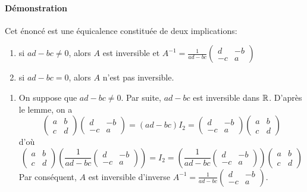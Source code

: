 \paragraph{Démonstration} Cet énoncé est une équicalence constituée de deux implications:
\begin{enumerate}
\item si $ad-bc\neq 0$, alors $A$ est inversible et $A^{-1}=\frac{1}{ad-bc}\begin{pmatrix} d & -b \\ -c & a\end{pmatrix}$
\item si $ad-bc=0$, alors $A$ n'est pas inversible.
\end{enumerate}
\begin{enumerate}
\item On suppose que $a d - b c \neq 0$. Par suite, $a d - b c$ est inversible dans $\mathbb{R}$. D'après le lemme, on a
$$\begin{pmatrix} a & b \\ c & d \end{pmatrix} \begin{pmatrix} d & -b \\ -c & a \end{pmatrix} = (a d - b c) I_2 =  \begin{pmatrix} d & -b \\ -c & a \end{pmatrix}\begin{pmatrix} a & b \\ c & d \end{pmatrix}$$
d'où
$$\begin{pmatrix} a & b \\ c & d \end{pmatrix}\left( \frac{1}{a d - b c} \begin{pmatrix} d & -b \\ -c & a \end{pmatrix}\right)=I_2=\left( \frac{1}{a d - b c} \begin{pmatrix} d & -b \\ -c & a \end{pmatrix}\right)\begin{pmatrix} a & b \\ c & d \end{pmatrix}$$
Par conséquent, $A$ est inversible d'inverse $A^{-1}=\frac{1}{a d - b c}\begin{pmatrix} d & -b \\ -c & a\end{pmatrix}$.

\end{enumerate}
